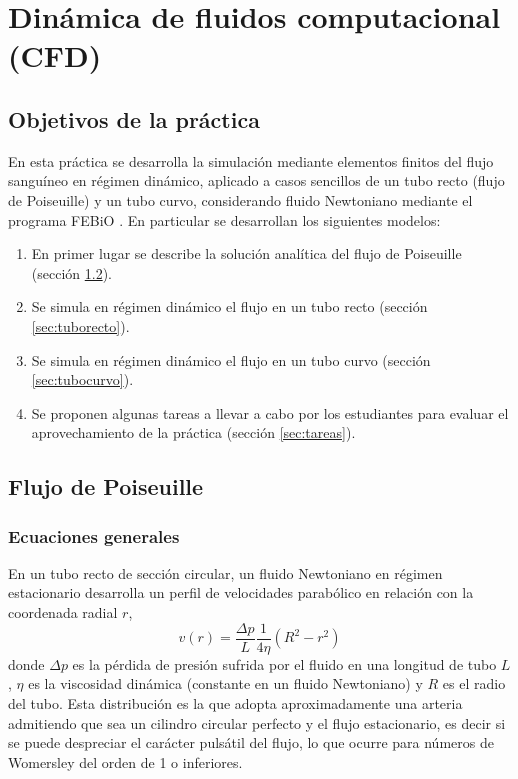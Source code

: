 \chapter{Dinámica de fluidos computacional (CFD)}
\label{cap4}


\section{Objetivos de la práctica}
\label{sec:objetivos}

En esta práctica se desarrolla la simulación mediante elementos finitos del flujo sanguíneo en régimen dinámico, aplicado a casos sencillos de un tubo recto (flujo de Poiseuille) y un tubo curvo, considerando fluido Newtoniano mediante el programa FEBiO \cite{FEBiO}.
En particular se desarrollan los siguientes modelos:
\begin{enumerate}
	\item
	En primer lugar se describe la solución analítica del flujo de Poiseuille (sección \ref{sec:poiseuille}).
	\item
	Se simula en régimen dinámico el flujo en un tubo recto (sección \ref{sec:tuborecto}).
	\item
	Se simula en régimen dinámico el flujo en un tubo curvo (sección \ref{sec:tubocurvo}).
	\item
	Se proponen algunas tareas a llevar a cabo por los estudiantes para evaluar el aprovechamiento de la práctica (sección \ref{sec:tareas}).
\end{enumerate}


\section{Flujo de Poiseuille}
\label{sec:poiseuille}

\subsection{Ecuaciones generales}
En un tubo recto de sección circular, un fluido Newtoniano en régimen estacionario desarrolla un perfil de velocidades parabólico en relación con la coordenada radial $r$,
\begin{equation}
	v(r) = \frac{\Delta p}{L}\frac{1}{4\eta}(R^{2}-r^{2})
	\label{eq:pois-vr}
\end{equation}
donde $\Delta p$ es la pérdida de presión sufrida por el fluido en una longitud de tubo $L$, $\eta$ es la viscosidad dinámica (constante en un fluido Newtoniano) y $R$ es el radio del tubo.
Esta distribución es la que adopta aproximadamente una arteria admitiendo que sea un cilindro circular perfecto y el flujo estacionario, es decir si se puede despreciar el carácter pulsátil del flujo, lo que ocurre para números de Womersley del orden de 1 o inferiores.

